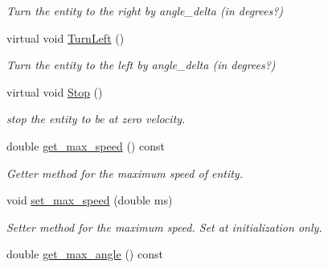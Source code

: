 \begin{DoxyCompactItemize}
\begin{DoxyCompactList}\small\item\em Turn the entity to the right by angle\+\_\+delta (in degrees?) \end{DoxyCompactList}\item 
virtual void \hyperlink{classMotionHandler_a922e3dd8c6a98b54607837c5e669c557}{Turn\+Left} ()\hypertarget{classMotionHandler_a922e3dd8c6a98b54607837c5e669c557}{}\label{classMotionHandler_a922e3dd8c6a98b54607837c5e669c557}

\begin{DoxyCompactList}\small\item\em Turn the entity to the left by angle\+\_\+delta (in degrees?) \end{DoxyCompactList}\item 
virtual void \hyperlink{classMotionHandler_aa04a0d87165965ea7ba8be6b21cfa0cf}{Stop} ()\hypertarget{classMotionHandler_aa04a0d87165965ea7ba8be6b21cfa0cf}{}\label{classMotionHandler_aa04a0d87165965ea7ba8be6b21cfa0cf}

\begin{DoxyCompactList}\small\item\em stop the entity to be at zero velocity. \end{DoxyCompactList}\item 
double \hyperlink{classMotionHandler_a4024f3b5562b5e49bfaeab9f82c0762b}{get\+\_\+max\+\_\+speed} () const \hypertarget{classMotionHandler_a4024f3b5562b5e49bfaeab9f82c0762b}{}\label{classMotionHandler_a4024f3b5562b5e49bfaeab9f82c0762b}

\begin{DoxyCompactList}\small\item\em Getter method for the maximum speed of entity. \end{DoxyCompactList}\item 
void \hyperlink{classMotionHandler_a32e832d35e73e9db85c16b3ff569196e}{set\+\_\+max\+\_\+speed} (double ms)\hypertarget{classMotionHandler_a32e832d35e73e9db85c16b3ff569196e}{}\label{classMotionHandler_a32e832d35e73e9db85c16b3ff569196e}

\begin{DoxyCompactList}\small\item\em Setter method for the maximum speed. Set at initialization only. \end{DoxyCompactList}\item 
double \hyperlink{classMotionHandler_a55eb7aeb355b6ee86b2bd8751fde6cb5}{get\+\_\+max\+\_\+angle} () const \hypertarget{classMotionHandler_a55eb7aeb355b6ee86b2bd8751fde6cb5}{}\label{classMotionHandler_a55eb7aeb355b6ee86b2bd8751fde6cb5}


\end{DoxyCompactItemize}
